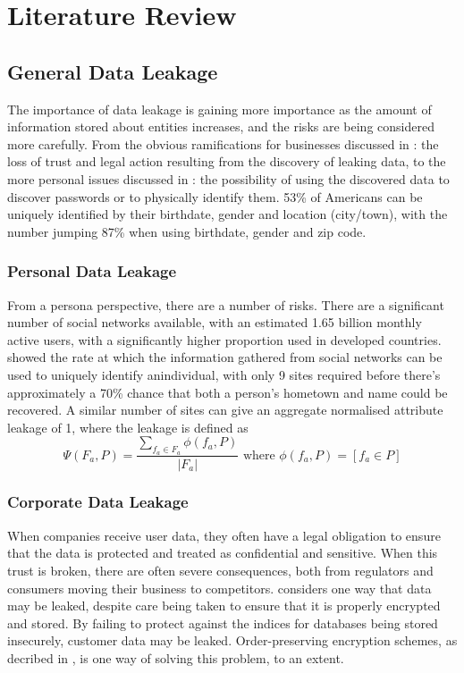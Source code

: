 \chapter{Literature Review}\label{chap:exres}

\section{General Data Leakage}

The importance of data leakage is gaining more importance as the amount of
information stored about entities increases, and the risks are being considered
more carefully.  From the obvious ramifications for businesses discussed in
\cite{papadimitriou2011data}: the loss of trust and legal action resulting from
the discovery of leaking data, to the more personal issues discussed in
\cite{irani2011modeling}: the possibility of using the discovered data to
discover passwords or to physically identify them.  53\% of Americans can be
uniquely identified by their birthdate, gender and location (city/town), with
the number jumping 87\% when using birthdate, gender and zip code.

\subsection{Personal Data Leakage}

From a persona perspective, there are a number of risks.  There are a
significant number of social networks available, with an estimated 1.65 billion
monthly active users, with a significantly higher proportion used in developed
countries.  \cite{irani2011modeling} showed the rate at which the information
gathered from social networks can be used to uniquely identify anindividual,
with only 9 sites required before there's approximately a 70\% chance that both
a person's hometown and name could be recovered.  A similar number of sites can
give an aggregate normalised attribute leakage of 1, where the leakage is
defined as \[\Psi(F_a,P)=\frac{\sum_{f_a\in F_a}\phi\left(f_a,
			P\right)}{|F_a|}\text{ where }\phi\left(f_a, P\right) =
	\left[f_a\in P\right]\]

\subsection{Corporate Data Leakage}

When companies receive user data, they often have a legal obligation to ensure
that the data is protected and treated as confidential and sensitive.  When
this trust is broken, there are often severe consequences, both from regulators
and consumers moving their business to competitors.
\cite{squicciarini2010preventing} considers one way that data may be leaked,
despite care being taken to ensure that it is properly encrypted and stored. By
failing to protect against the indices for databases being stored insecurely,
customer data may be leaked.  Order-preserving encryption schemes, as decribed
in \cite{agrawal2004order}, is one way of solving this problem, to an extent.


